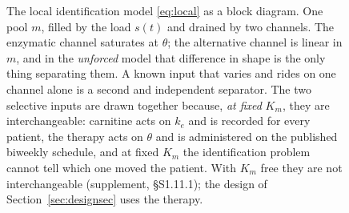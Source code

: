 \begin{figure}[htbp]
\centering
{}
\caption{The local identification model \eqref{eq:local} as a block diagram. One pool $m$,
filled by the load $s(t)$ and drained by two channels. The enzymatic channel saturates at
$\theta$; the alternative channel is linear in $m$, and in the \emph{unforced} model that
difference in shape is the only thing separating them. A known input that varies and rides
on one channel alone is a second and independent separator. The two selective inputs are
drawn together because, \emph{at fixed} $K_m$, they are interchangeable: carnitine acts on
$k_e$ and is recorded for every patient, the therapy acts on $\theta$ and is administered on
the published biweekly schedule, and at fixed $K_m$ the identification problem cannot tell
which one moved the patient. With $K_m$ free they are not interchangeable (supplement, \S S1.11.1); the design of Section~\ref{sec:designsec} uses the therapy.}
\label{fig:blockA}
\end{figure}


